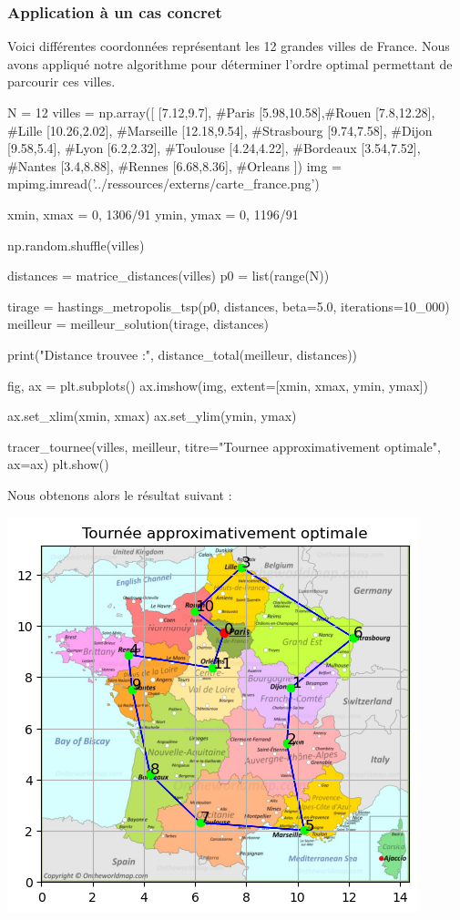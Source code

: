 \documentclass{article}
\begin{document}
\newpage
\subsubsection{Application à un cas concret}

Voici différentes coordonnées représentant les 12 grandes villes de France. Nous avons appliqué notre algorithme pour déterminer l'ordre optimal permettant de parcourir ces villes.

\begin{python}
N = 12
villes = np.array([
    [7.12,9.7],  #Paris
    [5.98,10.58],#Rouen
    [7.8,12.28], #Lille
    [10.26,2.02], #Marseille
    [12.18,9.54], #Strasbourg
    [9.74,7.58], #Dijon
    [9.58,5.4], #Lyon
    [6.2,2.32], #Toulouse
    [4.24,4.22], #Bordeaux
    [3.54,7.52], #Nantes
    [3.4,8.88],  #Rennes
    [6.68,8.36], #Orleans
])
img = mpimg.imread('../ressources/externs/carte_france.png') 

xmin, xmax = 0, 1306/91
ymin, ymax = 0, 1196/91

np.random.shuffle(villes)

distances = matrice_distances(villes)
p0 = list(range(N))

tirage = hastings_metropolis_tsp(p0, distances, beta=5.0, iterations=10_000)
meilleur = meilleur_solution(tirage, distances)

print("Distance trouvee :", distance_total(meilleur, distances))

fig, ax = plt.subplots()
ax.imshow(img, extent=[xmin, xmax, ymin, ymax])  

ax.set_xlim(xmin, xmax)
ax.set_ylim(ymin, ymax)

tracer_tournee(villes, meilleur, titre="Tournee approximativement optimale", ax=ax)
plt.show()
\end{python}

\newpage
Nous obtenons alors le résultat suivant :
\begin{center}

\includegraphics{france_tsp.png}

\end{center}
\end{document}
